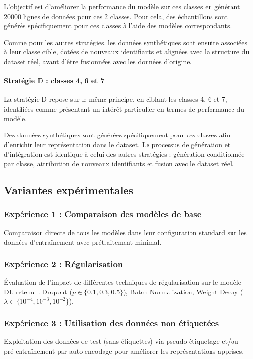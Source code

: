 \documentclass[conference]{IEEEtran}
\begin{document}
L’objectif est d’améliorer la performance du modèle sur ces classes en générant 20000 lignes de données pour ces 2 classes. Pour cela, des échantillons sont générés spécifiquement pour ces classes à l’aide des modèles correspondants.

Comme pour les autres stratégies, les données synthétiques sont ensuite associées à leur classe cible, dotées de nouveaux identifiants et alignées avec la structure du dataset réel, avant d’être fusionnées avec les données d’origine.

\paragraph{Stratégie D : classes 4, 6 et 7}

La stratégie D repose sur le même principe, en ciblant les classes 4, 6 et 7, identifiées comme présentant un intérêt particulier en termes de performance du modèle.

Des données synthétiques sont générées spécifiquement pour ces classes afin d’enrichir leur représentation dans le dataset. Le processus de génération et d’intégration est identique à celui des autres stratégies : génération conditionnée par classe, attribution de nouveaux identifiants et fusion avec le dataset réel.


\subsection{Variantes expérimentales}

\subsubsection{Expérience 1 : Comparaison des modèles de base}
Comparaison directe de tous les modèles dans leur configuration standard sur les données
d'entraînement avec prétraitement minimal.

\subsubsection{Expérience 2 : Régularisation}
Évaluation de l'impact de différentes techniques de régularisation sur le modèle DL retenu~:
Dropout ($p \in \{0.1, 0.3, 0.5\}$), Batch Normalization, Weight Decay
($\lambda \in \{10^{-4}, 10^{-3}, 10^{-2}\}$).

\subsubsection{Expérience 3 : Utilisation des données non étiquetées}
Exploitation des données de test (sans étiquettes) via pseudo-étiquetage et/ou pré-entraînement
par auto-encodage pour améliorer les représentations apprises.
\end{document}
